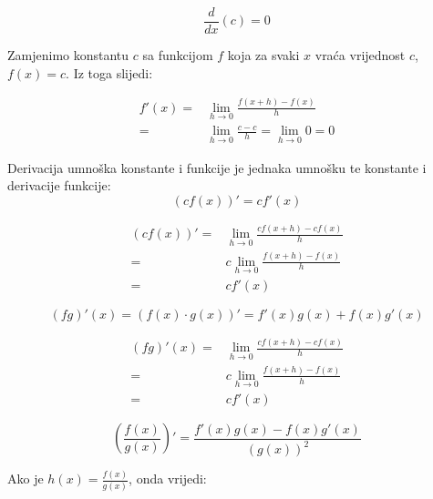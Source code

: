 \begin{multicols}{2}
\begin{proposition}
    $$
        \frac{d}{dx}(c) = 0
    $$
\end{proposition}

Zamjenimo konstantu $c$ sa funkcijom $f$ koja za svaki $x$ vraća vrijednost $c$, $f(x)=c$.
Iz toga slijedi:

\begin{align*}
    f'(x) =& \lim_{h\to 0}\frac{f(x+h)-f(x)}{h}\\
          =& \lim_{h\to 0}\frac{c - c}{h} = \lim_{h\to 0}0 = 0
\end{align*}

\begin{proposition}
    Derivacija umnoška konstante i funkcije je jednaka umnošku te konstante i derivacije funkcije:
    $$
        (cf(x))' = cf'(x)
    $$
\end{proposition}

\begin{align*}
    (cf(x))'=&\lim_{h\to 0}\frac{cf(x+h)-cf(x)}{h}\\
            =&c\lim_{h\to 0}\frac{f(x+h)-f(x)}{h}\\
            =&cf'(x)
\end{align*}

\end{multicols}

\begin{proposition}
    \label{eq:diff_prod}
    $$
        (fg)'(x) = (f(x)\cdot g(x))' = f'(x)g(x) + f(x)g'(x)
    $$
\end{proposition}

\begin{align*}
    (fg)'(x)=&\lim_{h\to 0}\frac{cf(x+h)-cf(x)}{h}\\
    =&c\lim_{h\to 0}\frac{f(x+h)-f(x)}{h}\\
    =&cf'(x)
\end{align*}

\begin{proposition}
    $$
        \left(\frac{f(x)}{g(x)}\right)' = \frac{f'(x)g(x) - f(x)g'(x)}{(g(x))^2}
    $$
\end{proposition}

Ako je $h(x) = \frac{f(x)}{g(x)}$, onda vrijedi:

